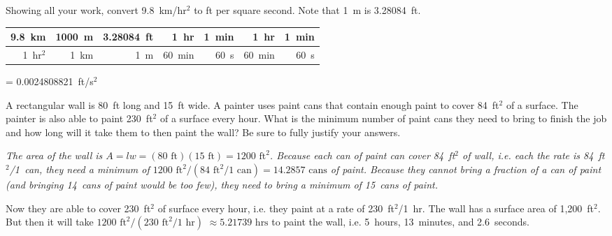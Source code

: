 \documentclass[12pt,letterpaper]{exam}
\begin{document}
\begin{questions}
\newpage
\question[10] Showing all your work, convert 9.8~km/hr$^2$ to ft per square second. Note that 1~m is 3.28084~ft. \pspace

\sol 
	\begin{table}[!ht]
	\centering
	\begin{tabular}{r|r|r|r|r|r|r}
	9.8~km    & 1000~m & 3.28084~ft & 1~hr      & 1~min & 1~hr      & 1~min \\ \hline
	1~hr$^2$ & 1~km     & 1~m           & 60~min  & 60~s & 60~min  & 60~s 
	\end{tabular}
	\pspace= 0.0024808821~ft/s$^2$
	\end{table} 



\newpage
\question[10] A rectangular wall is 80~ft long and 15~ft wide. A painter uses paint cans that contain enough paint to cover 84~ft$^2$ of a surface. The painter is also able to paint 230~ft$^2$ of a surface every hour. What is the minimum number of paint cans they need to bring to finish the job and how long will it take them to then paint the wall? Be sure to fully justify your answers. \pspace

{\itshape
\sol The area of the wall is $A= lw= (80 \text{ ft})(15 \text{ ft})= 1200 \text{ ft}^2$. Because each can of paint can cover 84~ft$^2$ of wall, i.e. each the rate is 84~ft$^2$/1~can, they need a minimum of $1200 \text{ ft}^2/ (84 \text{ ft}^2/1 \text{ can})= 14.2857 \text{ cans}$ of paint. Because they cannot bring a fraction of a can of paint (and bringing 14~cans of paint would be too few), they need to bring a minimum of 15~cans of paint. \pspace

Now they are able to cover 230~ft$^2$ of surface every hour, i.e. they paint at a rate of 230~ft$^2$/1~hr. The wall has a surface area of 1,200~ft$^2$. But then it will take $1200 \text{ ft}^2/(230 \text{ ft}^2/1 \text{ hr})$ $\approx 5.21739 \text{ hrs}$ to paint the wall, i.e. 5~hours, 13~minutes, and 2.6~seconds. 
}


\end{questions}
\end{document}
